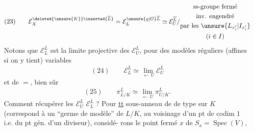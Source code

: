 \[
(23)\qquad
\mathcal E_X^{\deleted{\unsure{K}}\inserted{\overline L}}
=\mathcal E_L^{\unsure{g|G}\overline L}
\simeq\mathcal E_U^{\overline L}/\begin{gathered}\text{ss-groupe fermé}\\\text{inv. engendré}\\\text{par les }\unsure{L_{x_i'}|I_{x_i'}}\\(i\in I)\end{gathered}
\]
Notons que $\mathcal E_L^{\overline L}$ est la limite projective des $\mathcal E_U^{\overline L}$, pour des modèles réguliers (affines si on y tient) variables
\[
(24)\qquad\mathcal E_L^{\overline L}\simeq\lim_{\longleftarrow\,U}\mathcal E_U^{\overline L}
\]
et de $=$, bien sûr
\[
(25)\qquad\pi_{L/K}^{\overline L}\simeq\lim_{\longleftarrow\,U}\pi_{U/K}^{\overline L}.
\]
Comment récupérer les $\mathcal E_U^{\overline L}$  $\mathcal E_L^{\overline L}$ ? Pour \uline{tt} sous-anneau  de  de type  sur $K$ (correspond à un ``germe de modèle'' de $L/K$, au voisinage d'un pt de codim $1$ i.e. du pt gén. d'un diviseur), considé-\newline
rons le point fermé $x$ de $S_x=\operatorname{Spec}(V)$,
\margin{Dans les considérations qui suivent, $K$ (et $X,U$) ne jouent provisoirement aucun rôle --- \unsure{(|[}Mais on pourrait ``plus gén.'' regarder groupes de décomp. \deleted{\unsure{de dimension relative}} d'un des ``$U$'' \uline{mais seulement} \uline{\unsure{épis-comp|épais-comp}} (la ``généralisation'' étant triviale, \unsure{par} $\mathcal E_L\longrightarrow\mathcal E_U$)}
